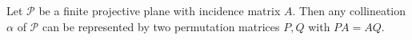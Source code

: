 Let $\mathcal{P}$ be a finite projective plane with incidence matrix $A$. Then any collineation $\alpha$ of $\mathcal{P}$ can be represented by two permutation matrices $P, Q$ with $PA = AQ$.

